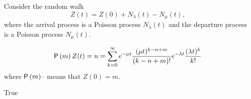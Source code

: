 \begin{exercise}[201703] 
  Consider the random walk
\begin{equation*}
  Z(t) = Z(0) + N_\lambda(t) - N_\mu(t), 
\end{equation*}
where the arrival process is a Poisson process $N_\lambda(t)$ and the
departure process is a Poisson process $N_\mu(t)$. 

\begin{equation*}
  \begin{split}
    \P{m}{Z(t)=n} 
&= \sum_{k=0}^\infty e^{-\mu t} \frac{(\mu t)^{k -n+m}}{(k-n +m)!} e^{-\lambda t} \frac{(\lambda t)^k}{k!} \\
  \end{split}
\end{equation*}
where $\P{m}{\cdot}$ means that $Z(0)=m$.

\begin{solution}
    True
\end{solution}
\end{exercise}


